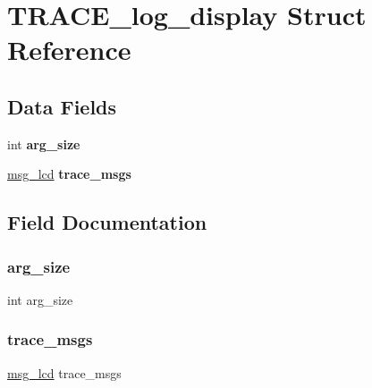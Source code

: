 \hypertarget{struct_t_r_a_c_e__log__display}{}\section{T\+R\+A\+C\+E\+\_\+log\+\_\+display Struct Reference}
\label{struct_t_r_a_c_e__log__display}
\subsection*{Data Fields}
\begin{DoxyCompactItemize}
\item
\hypertarget{struct_t_r_a_c_e__log__display_a711a6fa02335f49ddd69d7e64c8e74b5}{}\label{struct_t_r_a_c_e__log__display_a711a6fa02335f49ddd69d7e64c8e74b5}
int {\bfseries arg\+\_\+size}
\item
\hypertarget{struct_t_r_a_c_e__log__display_ae352c8d5925ee6d646efff5a13428dbd}{}\label{struct_t_r_a_c_e__log__display_ae352c8d5925ee6d646efff5a13428dbd}
\hyperlink{struct__msg__lcd}{msg\+\_\+lcd} {\bfseries trace\+\_\+msgs}
\end{DoxyCompactItemize}


\subsection{Field Documentation}
\hypertarget{struct_t_r_a_c_e__log__display_a711a6fa02335f49ddd69d7e64c8e74b5}{}\label{struct_t_r_a_c_e__log__display_a711a6fa02335f49ddd69d7e64c8e74b5}
\subsubsection{\texorpdfstring{arg\+\_\+size}{arg\_size}}
{\footnotesize\ttfamily int arg\+\_\+size}

\hypertarget{struct_t_r_a_c_e__log__display_ae352c8d5925ee6d646efff5a13428dbd}{}\label{struct_t_r_a_c_e__log__display_ae352c8d5925ee6d646efff5a13428dbd}
\subsubsection{\texorpdfstring{trace\+\_\+msgs}{trace\_msgs}}
{\footnotesize\ttfamily \hyperlink{struct__msg__lcd}{msg\+\_\+lcd} trace\+\_\+msgs}

